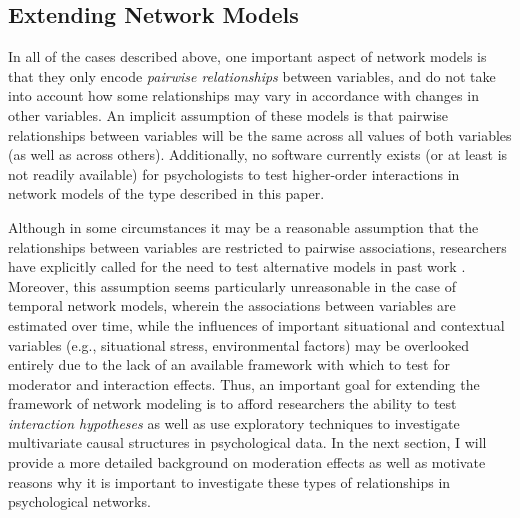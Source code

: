 \subsection{Extending Network Models}
In all of the cases described above, one important aspect of network models is that they only encode \textit{pairwise relationships} between variables, and do not take into account how some relationships may vary in accordance with changes in other variables. An implicit assumption of these models is that pairwise relationships between variables will be the same across all values of both variables (as well as across others). Additionally, no software currently exists (or at least is not readily available) for psychologists to test higher-order interactions in network models of the type described in this paper. 

Although in some circumstances it may be a reasonable assumption that the relationships between variables are restricted to pairwise associations, researchers have explicitly called for the need to test alternative models in past work \cite{fried2017moving}. Moreover, this assumption seems particularly unreasonable in the case of temporal network models, wherein the associations between variables are estimated over time, while the influences of important situational and contextual variables (e.g., situational stress, environmental factors) may be overlooked entirely due to the lack of an available framework with which to test for moderator and interaction effects. Thus, an important goal for extending the framework of network modeling is to afford researchers the ability to test \textit{interaction hypotheses} as well as use exploratory techniques to investigate multivariate causal structures in psychological data. In the next section, I will provide a more detailed background on moderation effects as well as motivate reasons why it is important to investigate these types of relationships in psychological networks. 

